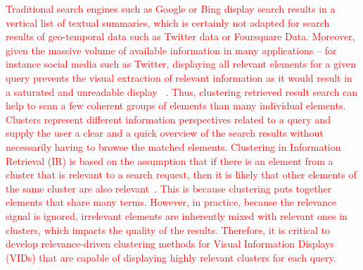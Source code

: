 \textcolor{red}{Traditional search engines such as Google or Bing display search
results in a vertical list of textual summaries, which is certainly not adapted for search results of geo-temporal data such as Twitter data or Foursquare Data. Moreover, given the massive volume of available
information in many applications -- for instance social media such as Twitter, displaying all relevant elements for a given
query prevents the visual extraction of relevant information as it
would result in a saturated and unreadable display ~\cite{Landesberger2011,Liu2014,Sun2013}.}
\textcolor{red}{Thus, clustering retrieved result search can help to scan a few coherent groups of elements than many individual elements. 
Clusters represent different information perspectives related to a query and supply the user a clear and a quick overview of the search results without necessarily having to browse the matched elements.
Clustering in Information Retrieval (IR) is based on the  assumption that if there is an element from a cluster that is relevant to a search request, then it is likely that other elements of the same cluster are also relevant~\cite{Manning2008,Jardine1971,Voorhees1985}. This is because clustering puts together elements that share many terms.
However, in practice, because the relevance signal is ignored, irrelevant elements are inherently mixed with relevant ones in clusters, which impacts the quality of the results.}
\textcolor{red}{Therefore, it is critical to develop relevance-driven clustering methods for Visual Information Displays (VIDs) that are capable of displaying highly relevant clusters for each query.}




